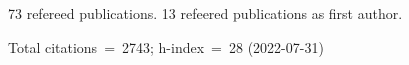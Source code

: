 73 refereed publications. 13 refeered publications as first author.

Total citations~=~2743; h-index~=~28 (2022-07-31)